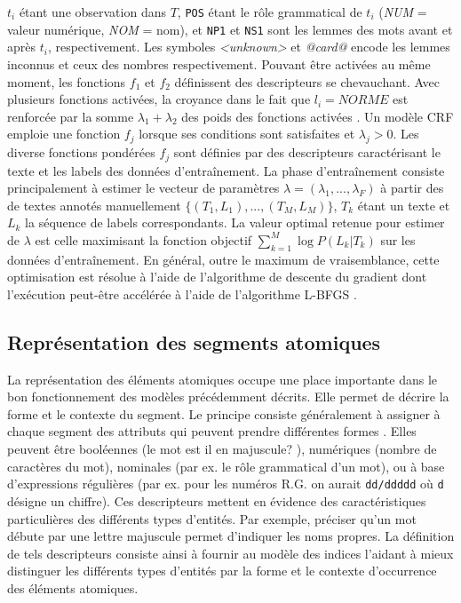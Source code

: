 $t_i$ étant une observation dans $T$, \verb|POS| étant le rôle grammatical de $t_i$ (\textit{NUM} = valeur numérique, \textit{NOM} = nom), et \verb|NP1| et \verb|NS1| sont les lemmes des mots avant et après $t_i$, respectivement. Les symboles \textit{<unknown>} et \textit{@card@} encode les lemmes inconnus et ceux des nombres respectivement. Pouvant être activées au même moment, les fonctions $f_1$ et $f_2$ définissent des descripteurs se chevauchant. Avec plusieurs fonctions activées, la croyance dans le fait que $l_i = NORME$ est renforcée par la somme $\lambda_1 + \lambda_2$ des poids  des fonctions activées \citep{Zhu2010CRFlecture}.  Un modèle CRF emploie une fonction $f_j$ lorsque ses conditions sont satisfaites et $\lambda_j > 0$. Les diverse fonctions pondérées $f_j$ sont définies par des descripteurs caractérisant le texte et les labels des données d'entraînement. La phase d'entraînement consiste principalement à estimer le vecteur de paramètres $\lambda = (\lambda_1,...,\lambda_F)$ à partir des de textes annotés manuellement $ \lbrace (T_1, L_1), ..., (T_M, L_M) \rbrace $, $ T_k $ étant un texte et $ L_k $ la séquence de labels correspondants. La valeur optimal retenue pour estimer de $\lambda$ est celle maximisant la fonction objectif   
$\sum\limits_ {k = 1} ^ M \log P (L_k \vert T_k) $ sur les données d'entraînement. En général, outre le maximum de vraisemblance, cette optimisation est résolue à l'aide de l'algorithme de descente du gradient dont l'exécution peut-être accélérée à l'aide de l'algorithme L-BFGS \citep{liu1989l-bfgs}.

\subsection{Représentation des segments atomiques}

La représentation des éléments atomiques occupe une place importante dans le bon fonctionnement des modèles  précédemment décrits. Elle permet de décrire la forme et le contexte du segment. Le principe consiste généralement à assigner à chaque segment des attributs qui peuvent prendre différentes formes \citep{nadeau2007nersurvey,sharnagat2014nersurvey}. Elles peuvent être booléennes (\og le mot est il en majuscule? \fg{}), numériques (nombre de caractères du mot), nominales (par ex. le rôle grammatical d'un mot), ou à base d'expressions régulières (par ex. pour les numéros R.G. on aurait \verb|dd/ddddd| où \verb|d| désigne un chiffre). Ces descripteurs mettent  en évidence des caractéristiques particulières des différents types d'entités. Par exemple, préciser qu'un mot débute par une lettre majuscule permet d'indiquer les noms propres. La définition de tels descripteurs consiste ainsi à fournir au modèle des indices l'aidant à mieux distinguer les différents types d'entités par la forme et le contexte d'occurrence des éléments atomiques. 

